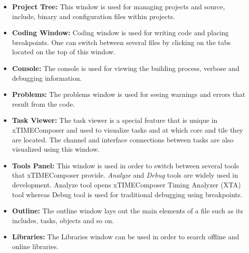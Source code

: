 \begin{itemize}
	\item \textbf{Project Tree:} This window is used for managing projects and source, include, binary and configuration files within projects.
	\item \textbf{Coding Window:} Coding window is used for writing code and placing breakpoints. One can switch between several files by clicking on the tabs located on the top of this window.
	\item \textbf{Console:} The console is used for viewing the building process, verbose and debugging information.
	\item \textbf{Problems:} The problems window is used for seeing warnings and errors that result from the code.
	\item \textbf{Task Viewer:} The task viewer is a special feature that is unique in xTIMEComposer and used to visualize tasks and at which core and tile they are located. The channel and interface connections between tasks are also visualized using this window.
	\item \textbf{Tools Panel:} This window is used in order to switch between several tools that xTIMEComposer provide. \textit{Analyze} and \textit{Debug} tools are widely used in development. Analyze tool opens xTIMEComposer Timing Analyzer (XTA) tool whereas Debug tool is used for traditional debugging using breakpoints.
	\item \textbf{Outline:} The outline window lays out the main elements of a file such as its includes, tasks, objects and so on.
	\item \textbf{Libraries:} The Libraries window can be used in order to search offline and online libraries.
\end{itemize}
